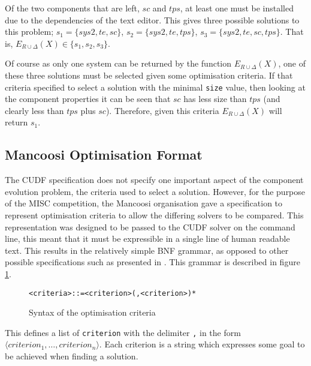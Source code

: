Of the two components that are left, $sc$ and $tps$, at least one must be installed due to the dependencies of the text editor.
This gives three possible solutions to this problem;
$s_1 = \{sys2, te, sc\}$,
$s_2 = \{sys2, te, tps\}$,
$s_3 = \{sys2, te, sc, tps\}$.
That is, $E_{R \cup \Delta}(X) \in \{s_1,s_2,s_3\}$.

Of course as only one system can be returned by the function $E_{R \cup \Delta}(X)$, one of these three solutions must be selected given some optimisation criteria.
If that criteria specified to select a solution with the minimal \verb+size+ value, 
then looking at the component properties it can be seen that $sc$ has less size than $tps$ (and clearly less than $tps$ plus $sc$).
Therefore, given this criteria $E_{R \cup \Delta}(X)$ will return  $s_1$.

\subsection{Mancoosi Optimisation Format}
\label{formal.mancoosioptimisationformat}
The CUDF specification does not specify one important aspect of the component evolution problem, the criteria used to select a solution.
However, for the purpose of the MISC competition, the Mancoosi organisation gave a specification to represent optimisation criteria to allow the differing solvers to be compared.
This representation was designed to be passed to the CUDF solver on the command line, this meant that it must be expressible in a single line of human readable text.
This results in the relatively simple BNF grammar, as opposed to other possible specifications such as presented in \cite{treinen2009}. 
This grammar is described in figure \ref{formal.optbnf}.

\begin{figure}[h!]
\begin{center}
\begin{alltt}
<criteria> ::= <criterion> (, <criterion>)*
\end{alltt}
  \caption{Syntax of the optimisation criteria}
  \label{formal.optbnf}
\end{center}
\end{figure}

This defines a list of \verb+criterion+ with the delimiter \verb+,+ in the form $\langle criterion_1, \ldots, criterion_n \rangle$.
Each criterion is a string which expresses some goal to be achieved when finding a solution.

